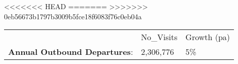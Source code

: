 <<<<<<< HEAD
=======
>>>>>>> 0eb56673b1797b3009b5fce18f6083f76c0eb04a
\begin{tabular}[t]{p{5cm}p{1.3cm}p{1.2cm}}
   & No\_Visits & Growth (pa) \\ 
 \textbf{Annual Outbound Departures}: & 2,306,776 & 5\% \\ 
  \end{tabular}
